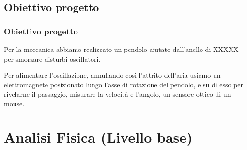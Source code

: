 \documentclass[
	10pt, %
]{beamer}
\begin{document}
\subsection{Obiettivo progetto}
\begin{frame}
	\frametitle{Obiettivo progetto}

	Per la meccanica abbiamo realizzato un pendolo aiutato dall'anello di XXXXX per smorzare disturbi oscillatori.

	\bigskip

	Per alimentare l'oscillazione, annullando così l'attrito dell'aria usiamo un elettromagnete posizionato lungo l'asse di rotazione del pendolo, e su di esso per rivelarne il passaggio, misurare la velocità e l'angolo, un sensore ottico di un mouse.

\end{frame}

\section{Analisi Fisica (Livello base)}

\AtBeginSection[]{
	\begin{frame}
		\tableofcontents[currentsection] %
	\end{frame}
}
\end{document}
